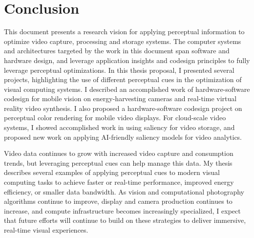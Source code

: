 \section{Conclusion}
\label{sec:concl}

This document presents a research vision for applying perceptual information to optimize video capture, processing and storage systems.
The computer systems and architectures targeted by the work in this document span software and hardware design, and leverage application insights and codesign principles to fully leverage perceptual optimizations.
In this thesis proposal, I presented several projects, highlighting the use of different perceptual cues in the optimization of visual computing systems. I described an accomplished work of hardware-software codesign for mobile vision on energy-harvesting cameras and real-time virtual reality video synthesis. I also proposed a hardware-software codesign project on perceptual color rendering for mobile video displays. 
For cloud-scale video systems, I showed accomplished work in using saliency for video storage, and proposed new work on applying AI-friendly saliency models for video analytics.

Video data continues to grow with increased video capture and consumption trends, but leveraging perceptual cues can help manage this data.
My thesis describes several examples of applying perceptual cues to modern visual computing tasks to achieve faster or real-time performance, improved energy efficiency, or smaller data bandwidth.
As vision and computational photography algorithms continue to improve, display and camera production continues to increase, and compute infrastructure becomes increasingly specialized, I expect that future efforts will continue to build on these strategies to deliver immersive, real-time visual experiences. 
